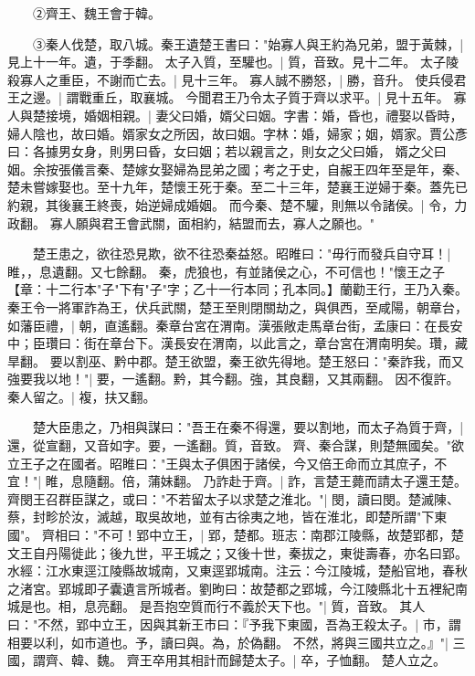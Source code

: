 　　②齊王、魏王會于韓。

　　③秦人伐楚，取八城。秦王遺楚王書曰："始寡人與王約為兄弟，盟于黃棘，|{
	見上十一年。遺，于季翻。
	}
太子入質，至驩也。|{
	質，音致。見十二年。
	}
太子陵殺寡人之重臣，不謝而亡去。|{
	見十三年。
	}
寡人誠不勝怒，|{
	勝，音升。
	}
使兵侵君王之邊。|{
	謂戰重丘，取襄城。
	}
今聞君王乃令太子質于齊以求平。|{
	見十五年。
	}
寡人與楚接境，婚姻相親。|{
	妻父曰婚，婿父曰姻。字書：婚，昏也，禮娶以昏時，婦人陰也，故曰婚。婿家女之所因，故曰姻。字林：婚，婦家；姻，婿家。賈公彥曰：各據男女身，則男曰昏，女曰姻；若以親言之，則女之父曰婚， 婿之父曰姻。余按張儀言秦、楚嫁女娶婦為昆弟之國；考之于史，自赧王四年至是年，秦、楚未嘗嫁娶也。至十九年，楚懷王死于秦。至二十三年，楚襄王逆婦于秦。蓋先已約親，其後襄王終喪，始逆婦成婚姻。
	}
而今秦、楚不驩，則無以令諸侯。|{
	令，力政翻。
	}
寡人願與君王會武關，面相約，結盟而去，寡人之願也。"

　　楚王患之，欲往恐見欺，欲不往恐秦益怒。昭睢曰："毋行而發兵自守耳！|{
	睢，，息遺翻。又七餘翻。
	}
秦，虎狼也，有並諸侯之心，不可信也！"懷王之子【章：十二行本"子"下有"子"字；乙十一行本同；孔本同。】蘭勸王行，王乃入秦。秦王令一將軍詐為王，伏兵武關，楚王至則閉關劫之，與俱西，至咸陽，朝章台，如藩臣禮，|{
	朝，直遙翻。秦章台宮在渭南。漢張敞走馬章台街，孟康曰：在長安中；臣瓚曰：街在章台下。漢長安在渭南，以此言之，章台宮在渭南明矣。瓚，藏旱翻。
	}
要以割巫、黔中郡。楚王欲盟，秦王欲先得地。楚王怒曰："秦詐我，而又強要我以地！"|{
	要，一遙翻。黔，其今翻。強，其良翻，又其兩翻。
	}
因不復許。秦人留之。|{
	複，扶又翻。
	}

　　楚大臣患之，乃相與謀曰："吾王在秦不得還，要以割地，而太子為質于齊，|{
	還，從宣翻，又音如字。要，一遙翻。質，音致。
	}
齊、秦合謀，則楚無國矣。"欲立王子之在國者。昭睢曰："王與太子俱困于諸侯，今又倍王命而立其庶子，不宜！"|{
	睢，息隨翻。倍，蒲妹翻。
	}
乃詐赴于齊。|{
	詐，言楚王薨而請太子還王楚。
	}
齊閔王召群臣謀之，或曰："不若留太子以求楚之淮北。"|{
	閔，讀曰閔。楚滅陳、蔡，封畛於汝，滅越，取吳故地，並有古徐夷之地，皆在淮北，即楚所謂"下東國"。
	}
齊相曰："不可！郢中立王，|{
	郢，楚都。班志：南郡江陵縣，故楚郢都，楚文王自丹陽徙此；後九世，平王城之；又後十世，秦拔之，東徙壽春，亦名曰郢。水經：江水東逕江陵縣故城南，又東逕郢城南。注云：今江陵城，楚船官地，春秋之渚宮。郢城即子囊遺言所城者。劉昫曰：故楚都之郢城，今江陵縣北十五裡紀南城是也。相，息亮翻。
	}
是吾抱空質而行不義於天下也。"|{
	質，音致。
	}
其人曰："不然，郢中立王，因與其新王市曰：『予我下東國，吾為王殺太子。|{
	巿，謂相要以利，如巿道也。予，讀曰與。為，於偽翻。
	}
不然，將與三國共立之。』"|{
	三國，謂齊、韓、魏。
	}
齊王卒用其相計而歸楚太子。|{
	卒，子恤翻。
	}
楚人立之。

